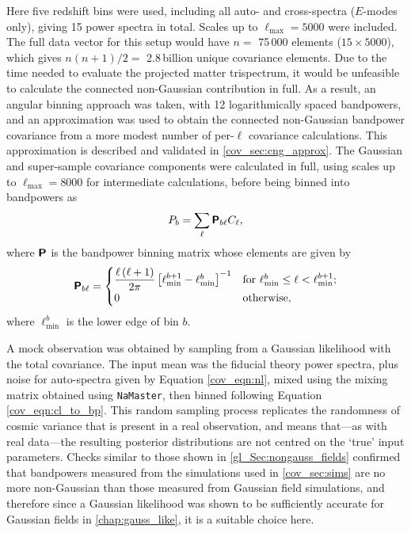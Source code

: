 Here five redshift bins were used, including all auto- and cross-spectra ($E$-modes only), giving 15 power spectra in total.
Scales up to $\ell_\text{max} = 5000$ were included.
The full data vector for this setup would have $n =$ 75\,000 elements ($15 \times 5000$), which gives $n \left( n + 1 \right) / 2 =$ 2.8\,billion unique covariance elements. Due to the time needed to evaluate the projected matter trispectrum, it would be unfeasible to calculate the connected non-Gaussian contribution in full.
As a result, an angular binning approach was taken, with 12 logarithmically spaced bandpowers, and an approximation was used to obtain the connected non-Gaussian bandpower covariance from a more modest number of per-$\ell$ covariance calculations. This approximation is described and validated in \autoref{cov_sec:cng_approx}.
The Gaussian and super-sample covariance components were calculated in full, using scales up to $\ell_\text{max} = 8000$ for intermediate calculations, before being binned into bandpowers as
\begin{equation}
P_b = \sum_\ell \bm{\mathsf{P}}_{b \ell} C_\ell,
\label{cov_eqn:cl_to_bp}
\end{equation}
where $\bm{\mathsf{P}}$ is the bandpower binning matrix whose elements are given by
\begin{equation}
\bm{\mathsf{P}}_{b \ell} =
\begin{cases}
\dfrac{\ell \left( \ell + 1 \right)}{2 \pi}
\left[ \ell_\text{min}^{b + 1} - \ell_\text{min}^b \right]^{-1}
& \text{for } \ell_\text{min}^b \leq \ell < \ell_\text{min}^{b + 1}; \\
0 & \text{otherwise,}
\end{cases}
\label{cov_eqn:pbl}
\end{equation}
where $\ell_\text{min}^b$ is the lower edge of bin $b$.

A mock observation was obtained by sampling from a Gaussian likelihood with the total covariance. The input mean was the fiducial theory power spectra, plus noise for auto-spectra given by Equation \eqref{cov_eqn:nl}, mixed using the mixing matrix obtained using \texttt{NaMaster}, then binned following Equation \eqref{cov_eqn:cl_to_bp}. This random sampling process replicates the randomness of cosmic variance that is present in a real observation, and means that---as with real data---the resulting posterior distributions are not centred on the `true' input parameters.
Checks similar to those shown in \autoref{gl_Sec:nongauss_fields} confirmed that bandpowers measured from the \citet{Takahashi2017} simulations used in \autoref{cov_sec:sims} are no more non-Gaussian than those measured from Gaussian field simulations, and therefore since a Gaussian likelihood was shown to be sufficiently accurate for Gaussian fields in \autoref{chap:gauss_like}, it is a suitable choice here.

